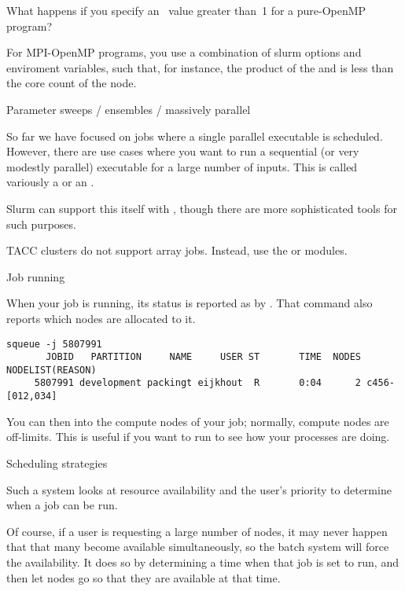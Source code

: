 \begin{exercise}
  What happens if you specify an~ value greater than~1
  for a pure-OpenMP program?
\end{exercise}

For  MPI-OpenMP programs, you use a combination
of slurm options and enviroment variables, such that, for instance,
the product of the  and  is less than the
core count of the node.

 {Parameter sweeps / ensembles / massively parallel}
\label{sec:slurm-sweep}

So far we have focused on jobs where a single parallel executable is scheduled.
However, there are use cases where you want to run a sequential (or very modestly parallel)
executable for a large number of inputs.
This is called variously a  or an .

Slurm can support this itself with ,
though there are more sophisticated  tools
for such purposes.

\begin{taccnote}
  TACC clusters do not support array jobs.
  Instead, use the  or  modules.
\end{taccnote}

 {Job running}

When your job is running, its status is reported as  by .
That command also reports which nodes are allocated to it.

\begin{verbatim}
squeue -j 5807991
       JOBID   PARTITION     NAME     USER ST       TIME  NODES NODELIST(REASON)
     5807991 development packingt eijkhout  R       0:04      2 c456-[012,034]
\end{verbatim}

You can then  into the compute nodes of your job; 
normally, compute nodes are off-limits.
This is useful if you want to run 
to see how your processes are doing.

 {Scheduling strategies}
\label{sec:slurm-schedule}

Such a system looks at resource availability
and the user's priority to determine when a job can be run.

Of course, if a user is requesting a large number of nodes,
it may never happen that that many become available simultaneously,
so the batch system will force the availability.
It does so by determining a time when that job is
set to run, and then let nodes go 
so that they are available at that time.

